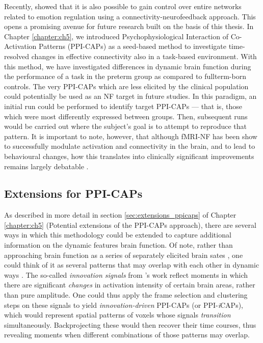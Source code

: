 Recently, \citet{Koush2017} showed that it is also possible to gain control over entire networks related to emotion regulation using a connectivity-neurofeedback approach. This opens a promising avenue for future research built on the basis of this thesis. In Chapter \ref{chapter:ch5}, we introduced Psychophysiological Interaction of Co-Activation Patterns (PPI-CAPs) as a seed-based method to investigate time-resolved changes in effective connectivity also in a task-based environment. With this method, we have investigated differences in dynamic brain function during the performance of a task in the preterm group as compared to fullterm-born controls. The very PPI-CAPs which are less elicited by the clinical population could potentially be used as an NF target in future studies. In this paradigm, an initial run could be performed to identify target PPI-CAPs --- that is, those which were most differently expressed between groups. Then, subsequent runs would be carried out where the subject's goal is to attempt to reproduce that pattern. It is important to note, however, that although fMRI-NF has been show to successfully modulate activation and connectivity in the brain, and to lead to behavioural changes, how this translates into clinically significant improvements remains largely debatable \citep{Thibault2018}.

\subsection*{ Extensions for PPI-CAPs}


As described in more detail in section \ref{sec:extensions_ppicaps} of Chapter \ref{chapter:ch5} (Potential extensions of the PPI-CAPs approach), there are several ways in which this methodology could be extended to capture additional information on the dynamic features brain function. Of  note, rather than approaching brain function as a series of separately elicited brain sates \citep{Leonardi2014,Gonzalez-Castillo2015a, Freitas2020}, one could think of it as several patterns that may overlap with each other in dynamic ways \citep{Karahanoglu2013,Karahanoglu2015a}. The so-called \textit{innovation signals} from \citet{Karahanoglu2013}'s work reflect moments in which there are significant \textit{changes} in activation intensity of certain brain areas, rather than pure amplitude.
One could thus apply the frame selection and clustering steps on these signals to yield \textit{innovation-driven} PPI-CAPs (or PPI-\textit{i}CAPs), which would represent spatial patterns of voxels whose signals \textit{transition} simultaneously. Backprojecting these would then recover their time courses, thus revealing moments when different combinations of those patterns may overlap.   


